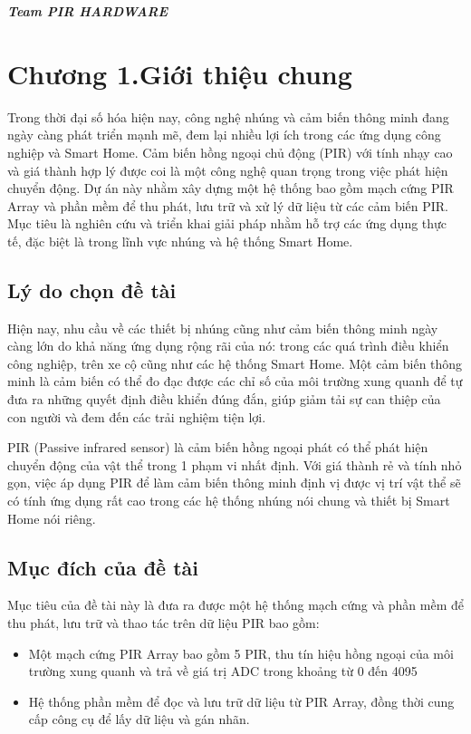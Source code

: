 \documentclass{article}
\begin{document}
\hspace*{\fill}\textit{\textbf{\fontsize{14pt}{0pt}\selectfont Team PIR HARDWARE}}

\cleardoublepage
{}
\tableofcontents %
\thispagestyle{empty}

\cleardoublepage
\section*{Chương 1.Giới thiệu chung}
\setcounter{section}{1}
Trong thời đại số hóa hiện nay, công nghệ nhúng và cảm biến thông minh đang ngày càng phát triển mạnh mẽ, đem lại nhiều lợi ích trong các ứng dụng công nghiệp và Smart Home. Cảm biến hồng ngoại chủ động (PIR) với tính nhạy cao và giá thành hợp lý được coi là một công nghệ quan trọng trong việc phát hiện chuyển động. Dự án này nhằm xây dựng một hệ thống bao gồm mạch cứng PIR Array và phần mềm để thu phát, lưu trữ và xử lý dữ liệu từ các cảm biến PIR. Mục tiêu là nghiên cứu và triển khai giải pháp nhằm hỗ trợ các ứng dụng thực tế, đặc biệt là trong lĩnh vực nhúng và hệ thống Smart Home.
\subsection{Lý do chọn đề tài }
Hiện nay, nhu cầu về các thiết bị nhúng cũng như cảm biến thông minh ngày càng lớn do khả năng ứng dụng rộng rãi của nó: trong các quá trình điều khiển công nghiệp, trên xe cộ cũng như các hệ thống Smart Home. Một cảm biến thông minh là cảm biến có thể đo đạc được các chỉ số của môi trường xung quanh để tự đưa ra những quyết định điều khiển đúng đắn, giúp giảm tải sự can thiệp của con người và đem đến các trải nghiệm tiện lợi. 

PIR (Passive infrared sensor) là cảm biến hồng ngoại phát có thể phát hiện chuyển động của vật thể trong 1 phạm vi nhất định. Với giá thành rẻ và tính nhỏ gọn, việc áp dụng PIR để làm cảm biến thông minh định vị được vị trí vật thể sẽ có tính ứng dụng rất cao trong các hệ thống nhúng nói chung và thiết bị Smart Home nói riêng. 
\subsection{Mục đích của đề tài}
Mục tiêu của đề tài này là đưa ra được một hệ thống mạch cứng và phần mềm để thu phát, lưu trữ và thao tác trên dữ liệu PIR bao gồm: 
\begin{itemize}
    \item Một mạch cứng PIR Array bao gồm 5 PIR, thu tín hiệu hồng ngoại của môi trường xung quanh và trả về giá trị ADC trong khoảng từ 0 đến 4095
    \item Hệ thống phần mềm để đọc và lưu trữ dữ liệu từ PIR Array, đồng thời cung cấp công cụ để lấy dữ liệu và gán nhãn. 
\end{itemize}
\end{document}
